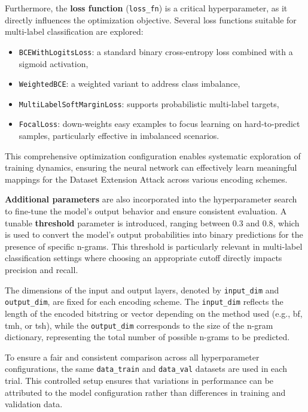 Furthermore, the \textbf{loss function} (\texttt{loss\_fn}) is a critical hyperparameter, as it directly influences the optimization objective.
Several loss functions suitable for multi-label classification are explored:
\begin{itemize}
    \item \texttt{BCEWithLogitsLoss}: a standard binary cross-entropy loss combined with a sigmoid activation,
    \item \texttt{WeightedBCE}: a weighted variant to address class imbalance,
    \item \texttt{MultiLabelSoftMarginLoss}: supports probabilistic multi-label targets,
    \item \texttt{FocalLoss}: down-weights easy examples to focus learning on hard-to-predict samples, particularly effective in imbalanced scenarios.
\end{itemize}

This comprehensive optimization configuration enables systematic exploration of training dynamics, ensuring the neural network can effectively learn meaningful mappings for the Dataset Extension Attack across various encoding schemes.

\textbf{Additional parameters} are also incorporated into the hyperparameter search to fine-tune the model's output behavior and ensure consistent evaluation.
A tunable \textbf{threshold} parameter is introduced, ranging between 0.3 and 0.8, which is used to convert the model's output probabilities into binary predictions for the presence of specific n-grams.
This threshold is particularly relevant in multi-label classification settings where choosing an appropriate cutoff directly impacts precision and recall.

The dimensions of the input and output layers, denoted by \texttt{input\_dim} and \texttt{output\_dim}, are fixed for each encoding scheme.
The \texttt{input\_dim} reflects the length of the encoded bitstring or vector depending on the method used (e.g., \ac{bf}, \ac{tmh}, or \ac{tsh}), while the \texttt{output\_dim} corresponds to the size of the n-gram dictionary, representing the total number of possible n-grams to be predicted.

To ensure a fair and consistent comparison across all hyperparameter configurations, the same \texttt{data\_train} and \texttt{data\_val} datasets are used in each trial.
This controlled setup ensures that variations in performance can be attributed to the model configuration rather than differences in training and validation data.

